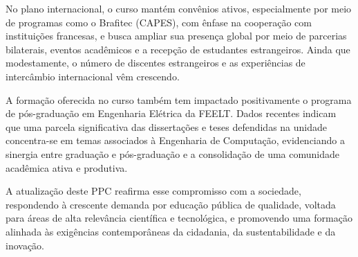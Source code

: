 No plano internacional, o curso mantém convênios ativos, especialmente por meio de programas como o Brafitec (CAPES), com ênfase na cooperação com instituições francesas, e busca ampliar sua presença global por meio de parcerias bilaterais, eventos acadêmicos e a recepção de estudantes estrangeiros. Ainda que modestamente, o número de discentes estrangeiros e as experiências de intercâmbio internacional vêm crescendo.

A formação oferecida no curso também tem impactado positivamente o programa de pós-graduação em Engenharia Elétrica da FEELT. Dados recentes indicam que uma parcela significativa das dissertações e teses defendidas na unidade concentra-se em temas associados à Engenharia de Computação, evidenciando a sinergia entre graduação e pós-graduação e a consolidação de uma comunidade acadêmica ativa e produtiva.

A atualização deste PPC reafirma esse compromisso com a sociedade, respondendo à crescente demanda por educação pública de qualidade, voltada para áreas de alta relevância científica e tecnológica, e promovendo uma formação alinhada às exigências contemporâneas da cidadania, da sustentabilidade e da inovação.
